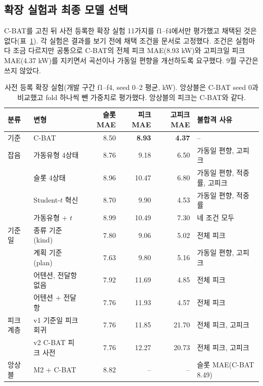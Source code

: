 \subsection{확장 실험과 최종 모델 선택}

C-BAT를 고친 뒤 사전 등록한 확장 실험 11가지를 f1--f4에서만 평가했고 채택된 것은 없다(표~\ref{tab:ch4-ext}). 각 실험은 결과를 보기 전에 채택 조건을 문서로 고정했다. 조건은 실험마다 조금 다르지만 공통으로 C-BAT의 전체 피크 MAE(8.93 kW)와 고피크일 피크 MAE(4.37 kW)를 지키면서 곡선이나 가동일 편향을 개선하도록 요구했다. 9월 구간은 쓰지 않았다.

\begin{table}[htbp]
\centering
\caption{사전 등록 확장 실험(개발 구간 f1--f4, seed 0--2 평균, kW). 앙상블은 C-BAT seed 0과 비교했고 fold 하나씩 뺀 가중치로 평가했다. 앙상블의 피크는 C-BAT와 같다.}
\label{tab:ch4-ext}
\small
\setlength{\tabcolsep}{4pt}
\begin{tabular}{llrrrl}
\toprule
분류 & 변형 & 슬롯 MAE & 피크 MAE & 고피크 MAE & 불합격 사유 \\
\midrule
기준 & C-BAT & 8.50 & \textbf{8.93} & \textbf{4.37} & -- \\
\midrule
잡음 & 가동유형 4상태 & 8.76 & 9.18 & 6.50 & 가동일 편향, 고피크 \\
 & 슬롯 4상태 & 8.96 & 10.47 & 6.80 & 가동일 편향, 적중률, 고피크 \\
 & Student-$t$ 혁신 & 8.70 & 9.90 & 4.53 & 가동일 편향, 적중률 \\
 & 가동유형 + $t$ & 8.99 & 10.49 & 7.30 & 네 조건 모두 \\
\midrule
기준일 & 종류 기준(kind) & 7.80 & 9.06 & 5.02 & 전체 피크 \\
 & 계획 기준(plan) & 7.63 & 9.80 & 5.16 & 가동일 편향, 고피크 \\
 & 어텐션, 전달항 없음 & 7.92 & 11.69 & 4.85 & 전체 피크 \\
 & 어텐션 + 전달항 & 7.76 & 11.93 & 4.57 & 전체 피크 \\
\midrule
피크 계층 & v1 기준일 피크 회귀 & 7.76 & 11.85 & 21.70 & 전체 피크, 고피크 \\
 & v2 C-BAT 피크 사전 & 7.76 & 12.27 & 20.73 & 전체 피크, 고피크 \\
\midrule
앙상블 & M2 + C-BAT & 8.82 & -- & -- & 슬롯 MAE(C-BAT 8.49) \\
\bottomrule
\end{tabular}
\end{table}


